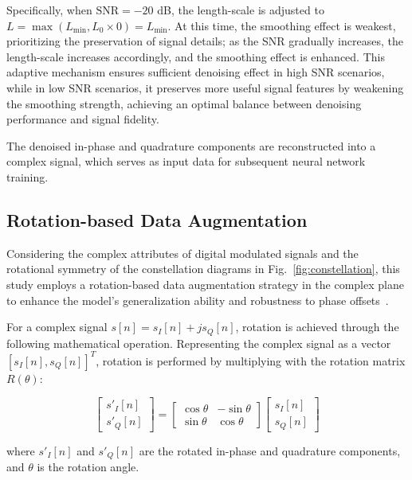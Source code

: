 \documentclass[conference]{IEEEtran}
\begin{document}
Specifically, when $\mathrm{SNR}=-20$ dB, the length-scale is adjusted to $L=\max(L_{\min}, L_0 \times 0)=L_{\min}$. At this time, the smoothing effect is weakest, prioritizing the preservation of signal details; as the SNR gradually increases, the length-scale increases accordingly, and the smoothing effect is enhanced. This adaptive mechanism ensures sufficient denoising effect in high SNR scenarios, while in low SNR scenarios, it preserves more useful signal features by weakening the smoothing strength, achieving an optimal balance between denoising performance and signal fidelity.

The denoised in-phase and quadrature components are reconstructed into a complex signal, which serves as input data for subsequent neural network training.

\subsection{Rotation-based Data Augmentation}

Considering the complex attributes of digital modulated signals and the rotational symmetry of the constellation diagrams in Fig.~\ref{fig:constellation}, this study employs a rotation-based data augmentation strategy in the complex plane to enhance the model's generalization ability and robustness to phase offsets~\cite{guo2024ulcnn}.

For a complex signal \(s[n] = s_I[n] + j s_Q[n]\), rotation is achieved through the following mathematical operation. Representing the complex signal as a vector \([s_I[n], s_Q[n]]^T\), rotation is performed by multiplying with the rotation matrix \(R(\theta)\):

\begin{equation}
\begin{bmatrix} s'_I[n] \\ s'_Q[n] \end{bmatrix} = \begin{bmatrix} \cos\theta & -\sin\theta \\ \sin\theta & \cos\theta \end{bmatrix} \begin{bmatrix} s_I[n] \\ s_Q[n] \end{bmatrix}
\end{equation}

where \(s'_I[n]\) and \(s'_Q[n]\) are the rotated in-phase and quadrature components, and \(\theta\) is the rotation angle.
\end{document}
